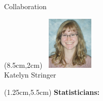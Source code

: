 \documentclass[12pt]{beamer}
\newcommand{\w}{1in}
\newcommand{\h}{1in}
\begin{document}
\begin{frame}{Collaboration}
  \begin{textblock*}{3cm}(8.5cm,2cm) %
 $\, $\includegraphics[width=\w,height=\h]{figs/stringer.jpg}\\
Katelyn Stringer
\end{textblock*}

  \begin{textblock*}{3cm}(1.25cm,5.5cm) %
    \textbf{Statisticians:}
  \end{textblock*}


\end{frame}
\end{document}
